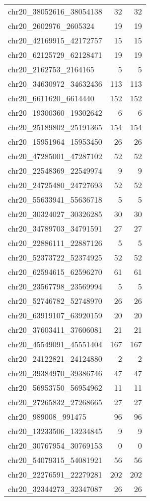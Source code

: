 \begin{longtable}{lrr}
chr20_38052616_38054138 & 32 & 32 \\
chr20_2602976_2605324 & 19 & 19 \\
chr20_42169915_42172757 & 15 & 15 \\
chr20_62125729_62128471 & 19 & 19 \\
chr20_2162753_2164165 & 5 & 5 \\
chr20_34630972_34632436 & 113 & 113 \\
chr20_6611620_6614440 & 152 & 152 \\
chr20_19300360_19302642 & 6 & 6 \\
chr20_25189802_25191365 & 154 & 154 \\
chr20_15951964_15953450 & 26 & 26 \\
chr20_47285001_47287102 & 52 & 52 \\
chr20_22548369_22549974 & 9 & 9 \\
chr20_24725480_24727693 & 52 & 52 \\
chr20_55633941_55636718 & 5 & 5 \\
chr20_30324027_30326285 & 30 & 30 \\
chr20_34789703_34791591 & 27 & 27 \\
chr20_22886111_22887126 & 5 & 5 \\
chr20_52373722_52374925 & 52 & 52 \\
chr20_62594615_62596270 & 61 & 61 \\
chr20_23567798_23569994 & 5 & 5 \\
chr20_52746782_52748970 & 26 & 26 \\
chr20_63919107_63920159 & 20 & 20 \\
chr20_37603411_37606081 & 21 & 21 \\
chr20_45549091_45551404 & 167 & 167 \\
chr20_24122821_24124880 & 2 & 2 \\
chr20_39384970_39386746 & 47 & 47 \\
chr20_56953750_56954962 & 11 & 11 \\
chr20_27265832_27268665 & 27 & 27 \\
chr20_989008_991475 & 96 & 96 \\
chr20_13233506_13234845 & 9 & 9 \\
chr20_30767954_30769153 & 0 & 0 \\
chr20_54079315_54081921 & 56 & 56 \\
chr20_22276591_22279281 & 202 & 202 \\
chr20_32344273_32347087 & 26 & 26 \\

\end{longtable}
